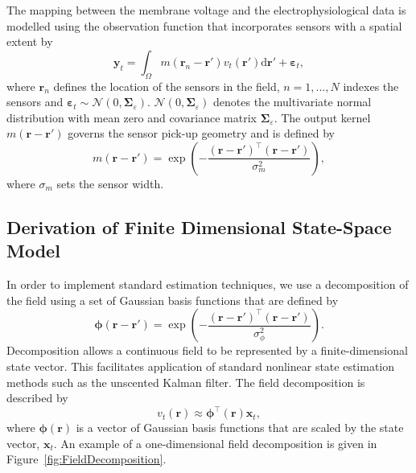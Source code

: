 \documentclass[10pt]{article}
\begin{document}
The mapping between the membrane voltage and the electrophysiological data is modelled using the observation function that incorporates sensors with a spatial extent by
\begin{equation}
    \label{eq:ObservationEquation}
	\mathbf{y}_t =
	\int_{\Omega}{
	    m\left(\mathbf{r}_n-\mathbf{r}'\right)v_t\left(\mathbf{r}'\right)
	\textrm{d}\mathbf{r}'} + 
	\boldsymbol{\varepsilon}_t, 
\end{equation}
where $\mathbf{r}_n$ defines the location of the sensors in the field, $n=1,...,N$ indexes the sensors and $\boldsymbol{\varepsilon}_t \sim \mathcal{N}\left(0,\boldsymbol{\Sigma}_{\varepsilon}\right)$. $\mathcal{N}\left(0,\boldsymbol{\Sigma}_{\varepsilon}\right)$ denotes the multivariate normal distribution with mean zero and covariance matrix $\boldsymbol{\Sigma}_{\varepsilon}$. The output kernel $m(\mathbf{r}-\mathbf{r}')$ governs the sensor pick-up geometry and is defined by 
\begin{equation}
	m\left(\mathbf{r}-\mathbf{r}'\right) = \exp{\left(-\frac{(\mathbf{r}-\mathbf{r}')^\top(\mathbf{r}-\mathbf{r}')}{\sigma_m^2}\right)},
\end{equation}
where $\sigma_m$ sets the sensor width.

\subsection*{Derivation of Finite Dimensional State-Space Model}\label{Sect:ReducedModelDerivation}
In order to implement standard estimation techniques, we use a decomposition of the field using a set of Gaussian basis functions that are defined by
\begin{equation}\label{eq:FieldBasisFunction}
	\boldsymbol\phi\left(\mathbf{r}-\mathbf{r}'\right) =
\exp{\left(-\frac{(\mathbf{r}-\mathbf{r}')^\top(\mathbf{r}-\mathbf{r}')}{\sigma_{\phi}^2}\right)}. 
\end{equation}
Decomposition allows a continuous field to be represented by a finite-dimensional state vector. This facilitates application of standard nonlinear state estimation methods such as the unscented Kalman filter. The field decomposition is described by 
\begin{equation}
	\label{DefFieldDecomp} v_t\left(\mathbf{r}\right) \approx \boldsymbol{\phi}^{\top}\left(\mathbf{r}\right) \mathbf{x}_t, 
\end{equation}
where $\mathbf{\boldsymbol{\phi}}(\mathbf{r})$ is a vector of Gaussian basis functions that are scaled by the state vector, $\mathbf{x}_t$. An example of a one-dimensional field decomposition is given in Figure~\ref{fig:FieldDecomposition}.%
\end{document}
